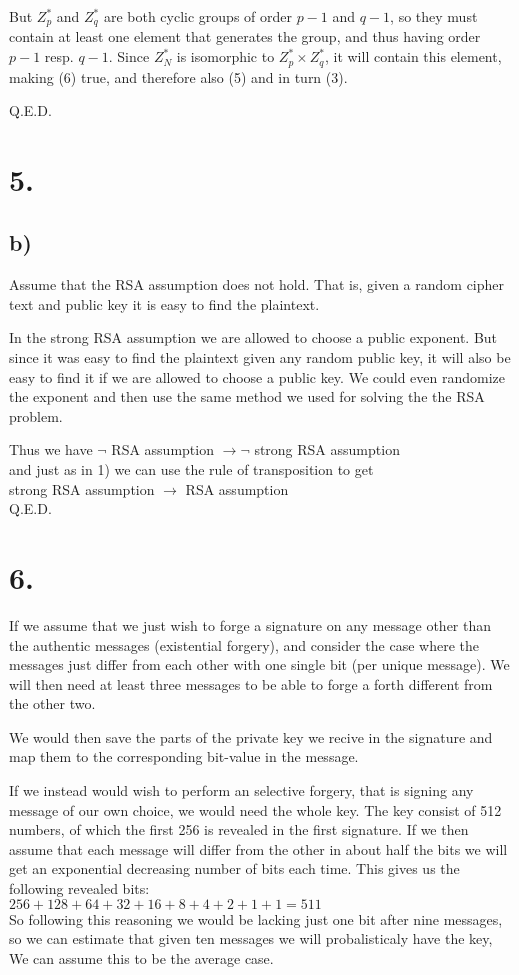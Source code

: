 \documentclass[a4paper,11pt]{article}
\begin{document}
	But $Z^*_p$ and $Z^*_q$ are both cyclic groups of order $p-1$ and $q-1$,
	so they must contain at least one element that generates the group, 
	and thus having order $p-1$ resp. $q-1$. Since $Z^*_N$ is isomorphic to $Z^*_p \times Z^*_q$,
	it will contain this element, making (6) true, and therefore also (5) and in turn (3).

	Q.E.D.

	\section*{5. }

	\subsection*{b) }
	Assume that the RSA assumption does not hold. That is, given a random cipher text and
	public key it is easy to find the plaintext.
	
	In the strong RSA assumption we are allowed to choose a public exponent. But since it was
	easy to find the plaintext given any random public key, it will also be easy to find
	it if we are allowed to choose a public key. We could even randomize the exponent
	and then use the same method we used for solving the the RSA problem.

	Thus we have $\neg $ RSA assumption $ \to \neg $ strong RSA assumption\\
	and just as in 1) we can use the rule of transposition to get\\
	strong RSA assumption $ \to $ RSA assumption\\

	Q.E.D.

	\section*{6. }
	If we assume that we just wish to forge a signature on any message other than the authentic
	messages (existential forgery), and consider the case where the messages just differ from 
	each other with one single bit (per unique message). We will then need at least three 
	messages to be able to forge a forth different from the other two.

	We would then save the parts of the private key we recive in the signature and map
	them to the corresponding bit-value in the message.

	If we instead would wish to perform an selective forgery, that is signing any message
	of our own choice, we would need the whole key. The key consist of 512 numbers, of which
	the first 256 is revealed in the first signature. If we then assume that each message
	will differ from the other in about half the bits we will get an exponential decreasing
	number of bits each time. This gives us the following revealed bits:\\
	$256 + 128 + 64 + 32 + 16 + 8 + 4 + 2 + 1 + 1= 511$\\
	So following this reasoning we would be lacking just one bit after nine messages, so we
	can estimate that given ten messages we will probalisticaly have the key, We can assume
	this to be the average case.
\end{document}
